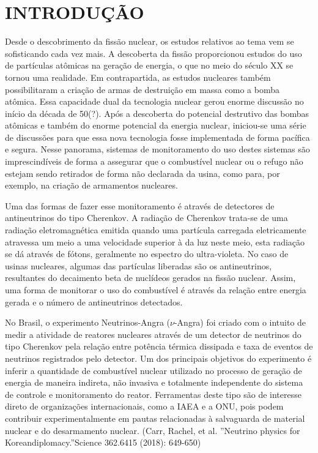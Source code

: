 \chapter{INTRODUÇÃO} \label{cap:intro}
\vspace{-2cm}

Desde o descobrimento da fissão nuclear, os estudos relativos ao tema vem se sofisticando cada vez mais. A descoberta da fissão proporcionou estudos do uso de partículas atômicas na geração de energia, o que no meio do século XX se tornou uma realidade. Em contrapartida, as estudos nucleares também possibilitaram a criação de armas de destruição em massa como a bomba atômica. Essa capacidade dual da tecnologia nuclear gerou enorme discussão no início da década de 50(?). Após a descoberta do potencial destrutivo das bombas atômicas e também do enorme potencial da energia nuclear, iniciou-se uma série de discussões para que essa nova tecnologia fosse implementada de forma pacífica e segura.
Nesse panorama, sistemas de monitoramento do uso destes sistemas são imprescindíveis de forma a assegurar que o combustível nuclear ou o refugo não estejam sendo retirados de forma não declarada da usina, como para, por exemplo, na criação de armamentos nucleares.

Uma das formas de fazer esse monitoramento é através de detectores de antineutrinos do tipo Cherenkov. A radiação de Cherenkov trata-se de uma radiação eletromagnética emitida quando uma partícula carregada eletricamente atravessa um meio a uma velocidade superior à da luz neste meio, esta radiação se dá através de fótons, geralmente no espectro do ultra-violeta. No caso de usinas nucleares, algumas das partículas liberadas são os antineutrinos, resultantes do decaimento beta de nuclídeos gerados na fissão nuclear. Assim, uma forma de monitorar o uso do combustível é através da relação entre energia gerada e o número de antineutrinos detectados. 



No Brasil, o experimento Neutrinos-Angra ($\nu$-Angra) foi criado com o intuito de medir a atividade de reatores nucleares através de um detector de neutrinos do tipo Cherenkov pela relação entre potência térmica dissipada e taxa de eventos de neutrinos registrados pelo detector. Um dos principais objetivos do experimento é inferir a quantidade de combustível nuclear utilizado no processo de geração de energia de maneira indireta, não invasiva e totalmente independente do sistema de controle e monitoramento do reator. Ferramentas deste tipo são de interesse direto de organizações internacionais, como a IAEA e a ONU, pois podem contribuir experimentalmente em pautas relacionadas à salvaguarda de material nuclear e do desarmamento nuclear. (Carr, Rachel, et al. ”Neutrino physics for Koreandiplomacy.”Science 362.6415 (2018): 649-650)

